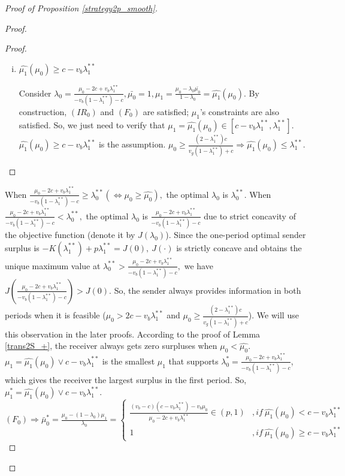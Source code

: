 \documentclass[11pt]{extarticle}
\newcommand{\lra}{\Leftrightarrow}
\newcommand{\ra}{\Rightarrow}
\newcommand{\M}{\vee}
\begin{document}
\begin{proof}[Proof of Proposition \ref{strategy2p_smooth}]
\begin{enumerate}
\begin{proof}
\begin{proof}
\begin{enumerate}[i)]
					
					\item $\widehat{\mu_1}(\mu_0) \geq c - v_b\lambda_1^{**}$
					
					Consider $\lambda_0 = \frac{\mu_0-2c +v_b \lambda_1^{**}}{-v_b(1-\lambda_1^{**})-c}, \bar{\mu_0} = 1, \mu_1 = \frac{\mu_0-\lambda_0 \bar{\mu_0}}{1-\lambda_0} =\widehat{\mu_1}(\mu_0)$. By construction, $(IR_0)$ and $(F_0)$ are satisfied; $\mu_1$'s constraints are also satisfied. So, we just need to verify that $\mu_1=\widehat{\mu_1}(\mu_0) \in [c - v_b\lambda_1^{**},\lambda_1^{**}]$.
					$\widehat{\mu_1}(\mu_0) \geq c - v_b\lambda_1^{**}$ is the assumption. $\mu_0 \geq \frac{(2-\lambda_1^{**})c}{v_g(1-\lambda_1^{**})+c} \ra \widehat{\mu_1}(\mu_0) \leq \lambda_1^{**}$.		
				\end{enumerate}
				\vspace{-20pt}
			\end{proof}
			
			When $\frac{\mu_0-2c +v_b \lambda_1^{**}}{-v_b(1-\lambda_1^{**})-c} \geq \lambda_0^{**} (\lra \mu_0 \geq \widehat{\mu_0}),$ the optimal $\lambda_0$ is $\lambda_0^{**}$. When $\frac{\mu_0-2c +v_b \lambda_1^{**}}{-v_b(1-\lambda_1^{**})-c} < \lambda_0^{**},$ the  optimal $\lambda_0$ is $\frac{\mu_0-2c +v_b \lambda_1^{**}}{-v_b(1-\lambda_1^{**})-c}$ due to strict concavity of the objective function (denote it by $J(\lambda_0)$). Since the one-period optimal sender surplus is $-K(\lambda_1^{**})+p \lambda_1^{**} = J(0),~ J(\cdot)$ is strictly concave and obtains the unique maximum value at $\lambda_0^{**} > \frac{\mu_0-2c +v_b \lambda_1^{**}}{-v_b(1-\lambda_1^{**})-c},$ we have $J(\frac{\mu_0-2c +v_b \lambda_1^{**}}{-v_b(1-\lambda_1^{**})-c}) > J(0)$. So, the sender always provides information in both periods when it is feasible ($\mu_0 > 2c-v_b\lambda_1^{**}$ and $\mu_0 \geq \frac{(2-\lambda_1^{**})c}{v_g(1-\lambda_1^{**})+c}$). We will use this observation in the later proofs. According to the proof of Lemma \ref{trans2S_+}, the receiver always gets zero surpluses when $\mu_0 < \widehat{\mu_0}$. $\mu_1 = \widehat{\mu_1}(\mu_0) \M c-v_b\lambda_1^{**}$ is the smallest $\mu_1$ that supports $\lambda_0^* = \frac{\mu_0-2c +v_b \lambda_1^{**}}{-v_b(1-\lambda_1^{**})-c}$, which gives the receiver the largest surplus in the first period. So, $\mu_1^* = \widehat{\mu_1}(\mu_0) \M c-v_b\lambda_1^{**}$. $(F_0) \ra \bar{\mu}_0^* = \frac{\mu_0 - (1-\lambda_0)\mu_1}{\lambda_0} = \begin{cases}
			\frac{(v_b-c)(c - v_b\lambda_1^{**})-v_b\mu_0}{\mu_0-2c+v_b \lambda_1^{**}} \in (p,1)& ,if~\widehat{\mu_1}(\mu_0)<c-v_b\lambda_1^{**}\\
			1 & ,if~\widehat{\mu_1}(\mu_0)\geq c-v_b\lambda_1^{**}
			\end{cases}$	
		\end{proof}
		

\end{enumerate}
\end{proof}
\end{document}
